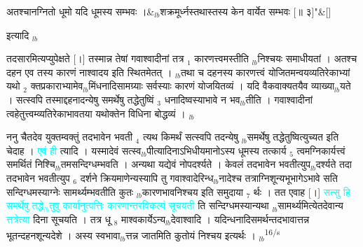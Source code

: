 \documentclass[article,12pt,a4paper]{memoir}%
\newcommand{\quotelemma}[1]{\textcolor{cyan}{#1}}
\newcounter{parCount}
\begin{document}
	    
	    \stanza[\smallbreak]
	  अतश्चानग्नितो धूमो यदि धूमस्य सम्भवः ।&{\tiny $_{lb}$}शक्रमूर्ध्नस्तथास्तस्य केन वार्येत सम्भवः [॥ ३]{\normalfontlatin\large\qquad{}"}\&[\smallbreak]
	  
	  
	  
	    \pstart  \leavevmode%
	    \hphantom{.}
	   इत्यादि
	{}
	\pend%
      {\tiny $_{lb}$}

	  
	  \pstart \leavevmode%
	तदसारमित्यप्युपेक्षते [।] तस्मान्न तेषां गवाश्वादीनां तत्र {\tiny $_{1}$} कारणत्त्वमस्तीति {\tiny $_{lb}$}निश्चयः समाधीयतां । अतश्च दहन एव तस्य कारणं नाश्वादय इति स्थितमेतत् । {\tiny $_{lb}$}तथा च दहनस्य कारणत्त्वं योजितमन्वयव्यतिरेकाभ्यां यथो {\tiny $_{2}$} क्तप्रकाराभ्यामेव{\tiny $_{lb}$}मिंधनादिसामग्र्याः सर्वस्याः कारणं योजयितव्यं । यदि वैकवाक्यतयैव व्याख्या{\tiny $_{lb}$}यते । सत्स्वपि तस्माद्दहनादन्येषु समर्थेषु तद्धेतुष्विं {\tiny $_{3}$} धनादिष्वस्याभावे न भव{\tiny $_{lb}$}तीति । गवाश्वादीनां त्वहेतुत्त्वम्व्यतिरेकाभावतया यथोक्तेन विधिना बोद्धव्यं ।
	{}
	\pend%
      {\tiny $_{lb}$}

	  
	  \pstart \leavevmode%
	ननु चैतदेव युक्तम्वक्तुं तदभावेन भवती {\tiny $_{4}$} त्यथ किमर्थं सत्स्वपि तदन्येषु {\tiny $_{lb}$}समर्थेषु तद्धेतुष्वित्युच्यत इति चेदाह । \quotelemma{एवं ही} \cite[2a4]{vn-msN} त्यादि । यस्मादेवं सत्स्व{\tiny $_{lb}$}पीत्यादिनाऽभिधीयमानोऽस्य धूमस्य तत्कार्य {\tiny $_{5}$} त्वमग्निकार्यत्त्वं समर्थितं निश्चि{\tiny $_{lb}$}तमसन्दिग्धम्भवति । अन्यथा यद्येवं नोपदर्श्यते । केवलं तदभावेन भवतीत्युप{\tiny $_{lb}$}दर्श्यते तदा तदभावेन भवतीत्युप {\tiny $_{6}$} दर्शने क्रियमाणेन्यस्यापि तु गवाश्वादेरिन्ध{\tiny $_{lb}$}नादेश्च तत्राग्निशून्यभूभागेऽभावे सति सन्दिग्धमस्याग्नेः सामर्थ्यम्भवतीति कुतः {\tiny $_{lb}$}कारणभावनिश्चय इति समुदाया {\tiny $_{7}$} र्थः । तत एवाह [।] \quotelemma{सत्सु हि समर्थेषु तद्धे{\tiny $_{lb}$}तुषु \cite[2a3]{vn-msN} कार्यानुत्पत्तिः कारणान्तरविकल्पं सूचयती} ति सन्दिग्धमस्यान्यथा {\tiny $_{lb}$}सामर्थ्यमित्येतदेवान्य \quotelemma{त्तत्रेत्या} \cite[2a4]{vn-msN} दिना सूचयति । तत्र धू {\tiny $_{8}$} माश्वकार्येऽन्य{\tiny $_{lb}$}देवाश्वादि । यदिन्धनादिसमर्थन्तदभावात्तन्न भूतन्दहनशून्यदेशे । अस्य स्वभावा{\tiny $_{lb}$}त्तन्न जातमिति कुतोयं निश्चय इत्यर्थः ।
	{}
	\pend%
      {\tiny $_{lb}$}\textsuperscript{\textenglish{16/s}}
\end{document}
